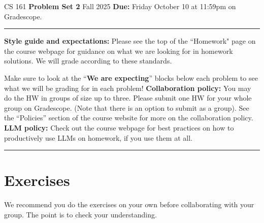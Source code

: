 \documentclass[11pt]{article}
\begin{document}
\noindent
CS 161 \hfill \textbf{Problem Set 2} \newline 
{Fall 2025} \hfill \textbf{Due:} Friday October 10 at 11:59pm on Gradescope.

\noindent
\rule{\linewidth}{0.4pt}

\noindent
\textbf{Style guide and expectations:} Please see the top of the ``Homework" page on the course webpage for guidance on what we are looking for in homework solutions.  We will grade according to these standards.

Make sure to look at the ``\textbf{We are expecting}'' blocks below each problem to see what we will be grading for in each problem!
\newline\newline
\textbf{Collaboration policy:} You may do the HW in groups of size up to three.  Please submit one HW for your whole group on Gradescope.  (Note that there is an option to submit as a group).  See the ``Policies'' section of the course website for more on the collaboration policy.
\noindent
\newline\newline
\textbf{LLM policy:} Check out the course webpage for best practices on how to productively use LLMs on homework, if you use them at all.   \newline\noindent
\rule{\linewidth}{0.4pt}

\section*{Exercises}
We recommend you do the exercises on your own before collaborating with your group.  The point is to check your understanding.
\end{document}
